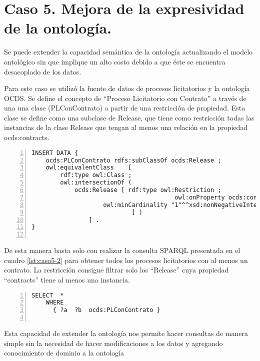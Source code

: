 \section{Caso 5. Mejora de la expresividad de la ontología. }

Se puede extender la capacidad semántica de la ontología actualizando el modelo ontológico sin que implique un alto costo debido a que éste se encuentra desacoplado de los datos.

Para este caso se utilizó la fuente de datos de procesos licitatorios y la ontología OCDS. Se define el concepto de “Proceso Licitatorio con Contrato” a través de una una clase (PLConContrato) a partir de una restricción de propiedad. Esta clase se define como una subclase de Release, que tiene como restricción todas las instancias de la clase Release que tengan al menos una relación en la propiedad ocds:contracts.


\begin{lstlisting}[captionpos=b, caption=Información referente al proceso licitatorio cuyo identificacor es, label={lst:caso5-1},  numbers=left,  numberstyle=\tiny\color{mygray},
    basicstyle=\small,frame=single]
INSERT DATA {
    ocds:PLConContrato rdfs:subClassOf ocds:Release ; 
    owl:equivalentClass    [ 
        rdf:type owl:Class ;
        owl:intersectionOf (   
            ocds:Release [ rdf:type owl:Restriction ;
                                        owl:onProperty ocds:contracts; 
                    owl:minCardinality "1"^^xsd:nonNegativeInteger ;
                            ] )
                ] .
}
    
 \end{lstlisting}

 De esta manera basta solo con realizar la consulta SPARQL presentada en el cuadro \ref{lst:caso5-2} para obtener todos los procesos licitatorios con al menos un contrato. La restricción consigue filtrar solo los “Release” cuya propiedad “contracts” tiene al menos una instancia.

 \begin{lstlisting}[captionpos=b, caption=Información referente a un proceso licitatorio, label=lst:caso5-2,  numbers=left,  numberstyle=\tiny\color{mygray},
    basicstyle=\small,frame=single]
SELECT  *
    WHERE
      { ?a  ?b  ocds:PLConContrato }
    
 \end{lstlisting}

 Esta capacidad de extender la ontología nos permite hacer consultas de manera simple sin la necesidad de hacer modificaciones a los datos y agregando conocimiento de dominio a la ontología